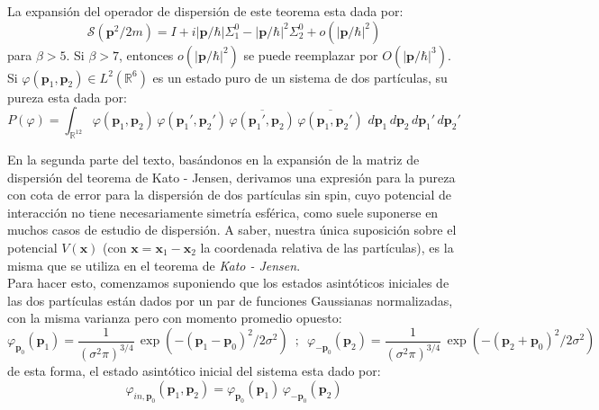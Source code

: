 \documentclass[12pt]{book}
\numberwithin{equation}{chapter}
\def\ol{\overline}
\def\R{\mathbb{R}}
\def\S{\mathcal{S}}
\def\x{\mathbf{x}}
\def\P{\mathbf{p}}
\begin{document}
La expansi\'on del operador de dispersi\'on de este teorema esta dada por:
$$ \S(\P^{2}/2m)= I + i|\P/\hbar| \Sigma_{1}^{0} - |\P/\hbar|^{2} \Sigma_{2}^{0} + o(|\P/\hbar|^{2}) $$
para $\beta >5$. Si $\beta >7$, entonces $o(|\P/\hbar|^{2})$ se puede reemplazar por $O(|\P/\hbar|^{3})$.\\
Si $\varphi(\P_{1} , \P_{2}) \in L^{2}(\R^{6})$ es un estado puro de un sistema de dos part\'iculas, su pureza esta dada por:
$$ P(\varphi)= \int_{\R^{12}} \varphi(\P_{1},\P_{2}) \, \varphi(\P_{1}',\P_{2}') \, \ol{\varphi(\P_{1}',\P_{2})} \, \ol{\varphi(\P_{1},\P_{2}')}\,\, d\P_{1}\,d\P_{2}\, d\P_{1}' \,d\P_{2}' $$
 
En la segunda parte del texto, bas\'andonos en la expansi\'on de la matriz de dispersi\'on del teorema de Kato - Jensen, derivamos una expresi\'on para la pureza con cota de error para la dispersi\'on de dos part\'iculas sin spin, cuyo potencial de interacci\'on no tiene necesariamente simetr\'ia esf\'erica, como suele suponerse en muchos casos de estudio de dispersi\'on. A saber, nuestra \'unica suposici\'on sobre el potencial $V(\x)$ (con $\x=\x_{1} - \x_{2}$ la coordenada relativa de las part\'iculas), es la misma que se utiliza en el teorema de \emph{Kato - Jensen}.\\

Para hacer esto, comenzamos suponiendo que los estados asint\'oticos iniciales de las dos part\'iculas est\'an dados por un par de funciones Gaussianas normalizadas, con la misma varianza pero con momento promedio opuesto: 
$$ \varphi_{\P_{0}}(\P_{1})= \frac{1}{( \sigma^{2}\pi )^{3/4}}\, \exp( -( \P_{1}-\P_{0} )^{2} / 2 \sigma^{2} ) \,\,\,;\,\,\, \varphi_{-\P_{0}}(\P_{2})= \frac{1}{( \sigma^{2}\pi )^{3/4}}\, \exp( -( \P_{2}+\P_{0} )^{2} / 2 \sigma^{2} ) $$
de esta forma, el estado asint\'otico inicial del sistema esta dado por:
$$ \varphi_{in,\P_{0}}( \P_{1},\P_{2} )= \varphi_{\P_{0}}(\P_{1}) \, \varphi_{-\P_{0}}(\P_{2}) $$
\end{document}
